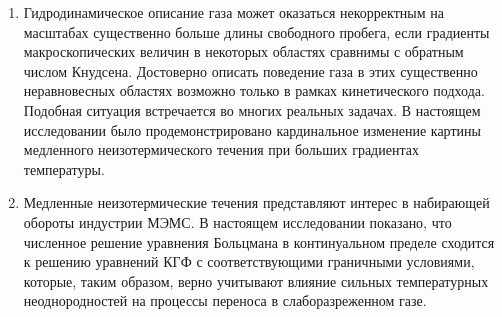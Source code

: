 \begin{enumerate}[wide]
\item Гидродинамическое описание газа может оказаться некорректным на масштабах существенно больше длины свободного пробега,
если градиенты макроскопических величин в некоторых областях сравнимы с обратным числом Кнудсена.
Достоверно описать поведение газа в этих существенно неравновесных областях
возможно только в рамках кинетического подхода.
Подобная ситуация встречается во многих реальных задачах.
В настоящем исследовании было продемонстрировано кардинальное изменение картины
медленного неизотермического течения при больших градиентах температуры.

\item Медленные неизотермические течения представляют интерес в набирающей обороты индустрии МЭМС.
В настоящем исследовании показано, что численное решение уравнения Больцмана в континуальном пределе
сходится к решению уравнений КГФ с соответствующими граничными условиями,
которые, таким образом, верно учитывают влияние сильных температурных
неоднородностей на процессы переноса в слаборазреженном газе.

\end{enumerate}
